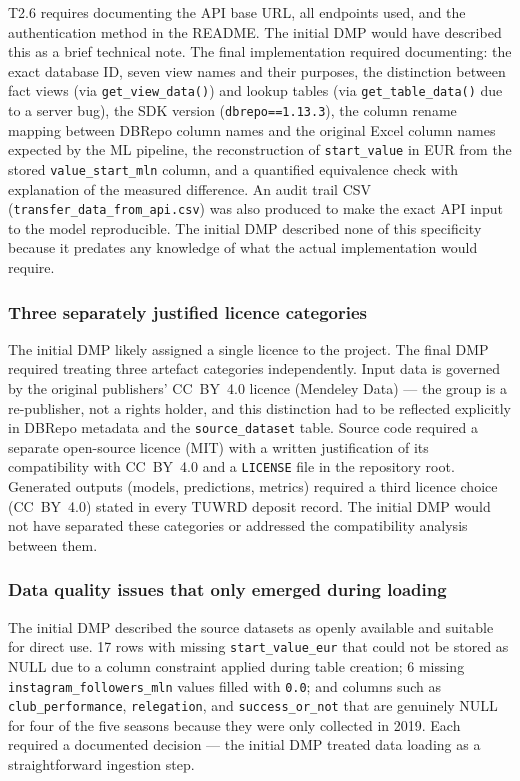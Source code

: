 T2.6 requires documenting the API base URL, all endpoints used, and the authentication
method in the README. The initial DMP would have described this as a brief technical
note. The final implementation required documenting: the exact database ID, seven view
names and their purposes, the distinction between fact views (via
\texttt{get\_view\_data()}) and lookup tables (via \texttt{get\_table\_data()} due to a
server bug), the SDK version (\texttt{dbrepo==1.13.3}), the column rename mapping
between DBRepo column names and the original Excel column names expected by the ML
pipeline, the reconstruction of \texttt{start\_value} in EUR from the stored
\texttt{value\_start\_mln} column, and a quantified equivalence check with explanation
of the measured difference. An audit trail CSV (\texttt{transfer\_data\_from\_api.csv})
was also produced to make the exact API input to the model reproducible. The initial DMP
described none of this specificity because it predates any knowledge of what the actual
implementation would require.

\subsubsection*{Three separately justified licence categories}

The initial DMP likely assigned a single licence to the project. The final DMP required
treating three artefact categories independently. Input data is governed by the original
publishers' CC~BY~4.0 licence (Mendeley Data) --- the group is a re-publisher, not a
rights holder, and this distinction had to be reflected explicitly in DBRepo metadata
and the \texttt{source\_dataset} table. Source code required a separate open-source
licence (MIT) with a written justification of its compatibility with CC~BY~4.0 and a
\texttt{LICENSE} file in the repository root. Generated outputs (models, predictions,
metrics) required a third licence choice (CC~BY~4.0) stated in every TUWRD deposit
record. The initial DMP would not have separated these categories or addressed the
compatibility analysis between them.

\subsubsection*{Data quality issues that only emerged during loading}

The initial DMP described the source datasets as openly available and suitable for
direct use. 17 rows with missing \texttt{start\_value\_eur} that could not be stored as
NULL due to a column constraint applied during table creation; 6 missing
\texttt{instagram\_followers\_mln} values filled with \texttt{0.0}; and columns such as
\texttt{club\_performance}, \texttt{relegation}, and \texttt{success\_or\_not} that are
genuinely NULL for four of the five seasons because they were only collected in 2019.
Each required a documented decision --- the initial DMP treated data loading as a
straightforward ingestion step.
